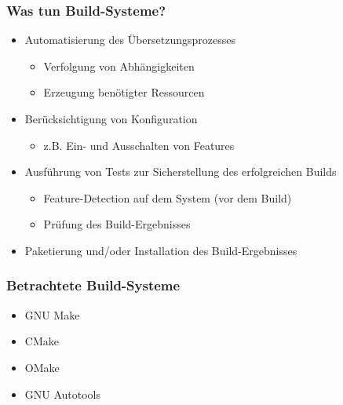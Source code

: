 \begin{frame}
	\frametitle{Was tun Build-Systeme?}
	\begin{itemize}
		\pause
		\item Automatisierung des Übersetzungsprozesses
			\begin{itemize}
				\pause
				\item Verfolgung von Abhängigkeiten
				\pause
				\item Erzeugung benötigter Ressourcen
			\end{itemize}
		\pause
		\item Berücksichtigung von Konfiguration
			\begin{itemize}
			\pause
			\item z.B. Ein- und Ausschalten von Features
			\end{itemize}
		\pause
		\item Ausführung von Tests zur Sicherstellung des erfolgreichen Builds
		\begin{itemize}
			\pause
			\item Feature-Detection auf dem System (vor dem Build)
			\pause
			\item Prüfung des Build-Ergebnisses
		\end{itemize}
		\pause
		\item Paketierung und/oder Installation des Build-Ergebnisses
	\end{itemize}
\end{frame}

\begin{frame}
	\frametitle{Betrachtete Build-Systeme}
	\begin{itemize}
		\pause
		\item GNU Make
		\item CMake
		\item OMake
		\item GNU Autotools
	\end{itemize}
\end{frame}

